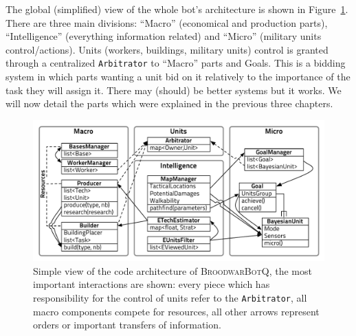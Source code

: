 The global (simplified) view of the whole bot's architecture is shown in Figure~\ref{fig:codearchitecture}. There are three main divisions: ``Macro'' (economical and production parts), ``Intelligence'' (everything information related) and ``Micro'' (military units control/actions). Units (workers, buildings, military units) control is granted through a centralized \texttt{Arbitrator} to ``Macro'' parts and Goals. This is a bidding system in which parts wanting a unit bid on it relatively to the importance of the task they will assign it. There may (should) be better systems but it works. We will now detail the parts which were explained in the previous three chapters.

\begin{figure}[h]
\begin{center}
\includegraphics[width=16cm]{images/BBQEarly2012.pdf}
\caption{Simple view of the code architecture of \textsc{BroodwarBotQ}, the most important interactions are shown: every piece which has responsibility for the control of units refer to the \texttt{Arbitrator}, all macro components compete for resources, all other arrows represent orders or important transfers of information.}
\label{fig:codearchitecture}
\end{center}
\end{figure}


